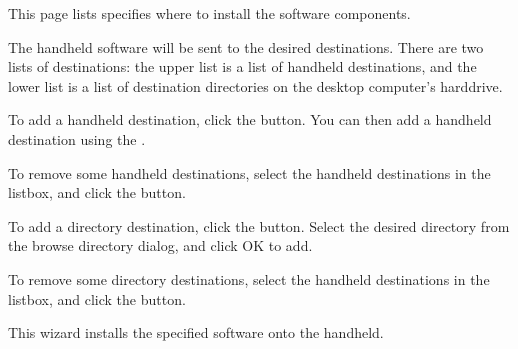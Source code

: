 This page lists specifies where to install the software components. 

The handheld software will be sent to the desired destinations. There are two 
lists of destinations: the upper list is a list of handheld destinations, and 
the lower list is a list of destination directories on the desktop computer's 
harddrive.

To add a handheld destination, click the  
button. You can then add a handheld destination using the
\helpignore{\ref{sec:pd-handheld-dest-dialog}}
.

To remove some handheld destinations, select the handheld destinations in 
the listbox, and click the  button.

To add a directory destination, click the 
 button. Select the desired directory 
from the browse directory dialog, and click OK to add. 

To remove some directory destinations, select the handheld destinations in 
the listbox, and click the  button.


This wizard installs the specified \brandingapplicationsuitename software onto the handheld.


